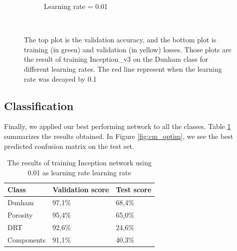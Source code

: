 \begin{figure}
{\begin{subfigure}[b]{.6\textwidth}
\label{fig:optim_001}
\caption{Learning rate = 0.01}
\end{subfigure}%
}\\
\caption[Training with different Learning rates]{The top plot is the validation accuracy, and the bottom plot is training (in green) and validation (in yellow) losses. Those plots are the result of training Inception\_v3 on the Dunham class for different learning rates. The red line represent when the learning rate was decayed by 0.1}
\label{fig:optim_plot}
\end{figure}


\subsection{Classification}

Finally, we applied our best performing network to all the classes. Table \ref{tab:optimall} summarizes the results obtained. In Figure \ref{fig:cm_optim}, we see the best predicted confusion matrix on the test set.  

\begin{table}
\caption{\label{tab:optimall} The results of training Inception network using 0.01 as learning rate learning rate}
\centering
\begin{tabular}[b]{| l | l | l |}
\hline
    Class & Validation score  & Test score\\ \hline
    Dunham  &  97,1\%  & 68,4\% \\ \hline
    Porosity & 95,4\% &  65,0\%\\ \hline
    DRT & 92,6\% &  24,6\% \\ \hline
    Components & 91,1\% &  40,3\% \\ \hline
\end{tabular} 
\end{table}

